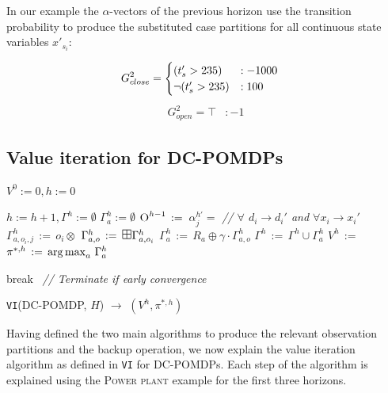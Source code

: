 \documentclass{article}
\def\argmax{\operatornamewithlimits{arg\max}}
\begin{document}
In our example the $\alpha$-vectors of the previous horizon use the transition probability to produce the substituted case partitions for all continuous state variables $x'_{s_i}$: 

\begin{align}
\hspace{-4mm} 
G_{close}^2= 
\begin{cases}
(t_s'>235) &: -1000 \\
\neg(t_s'>235) &: 100 \\
\end{cases}
\end{align}
\begin{align*}
G_{open}^2=  \top &: -1
\end{align*}



\subsection{Value iteration for DC-POMDPs} 

\incmargin{.5em}
\linesnumbered
\begin{algorithm}[t!]
\vspace{-.5mm}
\dontprintsemicolon
{}
\Begin
{
   $V^0:=0, h:=0$\;
   {
       $h:=h+1, \Gamma^h :=\emptyset$\;
       {
			$\Gamma_{a}^h :=\emptyset$ \;       		
       		$\textsc{O}^{h-1} \,:=\,$ \;
       		 {
       			{
   	 		  		$\alpha_j^{h'}=$  \;
   	 		  		\emph{// $\forall$ $d_i \to d_i'$ and $\forall x_i \to x_i'$} \; 
   	 		    	$\Gamma_{a,o_i,j}^h \,:=\, o_i \otimes$ \;
       	      	}
       	      	$\Gamma_{a,o}^h\,:=\,\textrm{\large $\boxplus$} \Gamma_{a,o_i}^h$\;
       	     }
           $\Gamma_a^{h} \,:=\,R_a \oplus \gamma \cdot \Gamma_{a,o}^h$\;
            $\Gamma^{h} \,:=\, \Gamma^{h} \cup \Gamma_a^{h}$\;
        }  
              $V^{h} \,:=\, $ \;
              $\pi^{*,h} \,:=\, \argmax_{a} \, \Gamma_a^{h}$\;

           {break $\,$ \emph{// Terminate if early convergence}\;}
   }
      \;
}
\caption{\footnotesize \texttt{VI}(DC-POMDP, $H$) $\longrightarrow$ $(V^h,\pi^{*,h})$ \label{alg:vi}}
\vspace{-1mm}
\end{algorithm}
\decmargin{.5em}
Having defined the two main algorithms to produce the relevant observation partitions and the backup operation, we now explain the value iteration algorithm as defined in \texttt{VI} for DC-POMDPs. Each step of the algorithm is explained using the \textsc{Power plant} example for the first three horizons.
\end{document}
